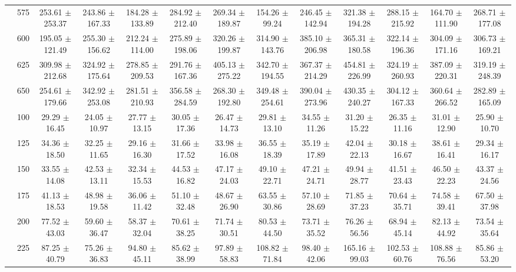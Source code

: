 \begin{table}[h]
{\begin{tabular}{
        ccccccccccccc}
 & 575& 253.61 $\pm$ 253.37& 243.86 $\pm$ 167.33& 184.28 $\pm$ 133.89& 284.92 $\pm$ 212.40& 269.34 $\pm$ 189.87& 154.26 $\pm$ 99.24& 246.45 $\pm$ 142.94& 321.38 $\pm$ 194.28& 288.15 $\pm$ 215.92& 164.70 $\pm$ 111.90& 268.71 $\pm$ 177.08 \\ 
 & 600& 195.05 $\pm$ 121.49& 255.30 $\pm$ 156.62& 212.24 $\pm$ 114.00& 275.89 $\pm$ 198.06& 320.26 $\pm$ 199.87& 314.90 $\pm$ 143.76& 385.10 $\pm$ 206.98& 365.31 $\pm$ 180.58& 322.14 $\pm$ 196.36& 304.09 $\pm$ 171.16& 306.73 $\pm$ 169.21 \\ 
 & 625& 309.98 $\pm$ 212.68& 324.92 $\pm$ 175.64& 278.85 $\pm$ 209.53& 291.76 $\pm$ 167.36& 405.13 $\pm$ 275.22& 342.70 $\pm$ 194.55& 367.37 $\pm$ 214.29& 454.81 $\pm$ 226.99& 324.19 $\pm$ 260.93& 387.09 $\pm$ 220.31& 319.19 $\pm$ 248.39 \\ 
 & 650& 254.61 $\pm$ 179.66& 342.92 $\pm$ 253.08& 281.51 $\pm$ 210.93& 356.58 $\pm$ 284.59& 268.30 $\pm$ 192.80& 349.48 $\pm$ 254.61& 390.04 $\pm$ 273.96& 430.35 $\pm$ 240.27& 304.12 $\pm$ 167.33& 360.64 $\pm$ 266.52& 282.89 $\pm$ 165.09 \\ \hline 
 & 100& 29.29 $\pm$ 16.45& 24.05 $\pm$ 10.97& 27.77 $\pm$ 13.15& 30.05 $\pm$ 17.36& 26.47 $\pm$ 14.73& 29.81 $\pm$ 13.10& 34.55 $\pm$ 11.26& 31.20 $\pm$ 15.22& 26.35 $\pm$ 11.16& 31.01 $\pm$ 12.90& 25.90 $\pm$ 10.70 \\ 
 & 125& 34.36 $\pm$ 18.50& 32.25 $\pm$ 11.65& 29.16 $\pm$ 16.30& 31.66 $\pm$ 17.52& 33.98 $\pm$ 16.08& 36.55 $\pm$ 18.39& 35.19 $\pm$ 17.89& 42.04 $\pm$ 22.13& 30.18 $\pm$ 16.67& 38.61 $\pm$ 16.41& 29.34 $\pm$ 16.17 \\ 
 & 150& 33.55 $\pm$ 14.08& 42.53 $\pm$ 13.11& 32.34 $\pm$ 15.53& 44.53 $\pm$ 16.82& 47.17 $\pm$ 24.03& 49.10 $\pm$ 22.71& 47.21 $\pm$ 24.71& 49.94 $\pm$ 28.77& 41.51 $\pm$ 23.43& 46.50 $\pm$ 22.23& 43.37 $\pm$ 24.56 \\ 
 & 175& 41.13 $\pm$ 18.53& 48.98 $\pm$ 19.58& 36.06 $\pm$ 11.42& 51.10 $\pm$ 32.48& 48.67 $\pm$ 26.90& 63.55 $\pm$ 30.86& 57.10 $\pm$ 28.69& 71.85 $\pm$ 37.23& 70.64 $\pm$ 35.71& 74.58 $\pm$ 39.41& 67.50 $\pm$ 37.98 \\ 
 & 200& 77.52 $\pm$ 43.03& 59.60 $\pm$ 36.47& 58.37 $\pm$ 32.04& 70.61 $\pm$ 38.25& 71.74 $\pm$ 30.51& 80.53 $\pm$ 44.50& 73.71 $\pm$ 35.52& 76.26 $\pm$ 56.56& 68.94 $\pm$ 45.14& 82.13 $\pm$ 44.92& 73.54 $\pm$ 35.64 \\ 
 & 225& 87.25 $\pm$ 40.79& 75.26 $\pm$ 36.83& 94.80 $\pm$ 45.11& 85.62 $\pm$ 38.99& 97.89 $\pm$ 58.83& 108.82 $\pm$ 71.84& 98.40 $\pm$ 42.06& 165.16 $\pm$ 99.03& 102.53 $\pm$ 60.76& 108.88 $\pm$ 76.56& 85.86 $\pm$ 53.20 \\ 

\end{tabular}}
\end{table}
